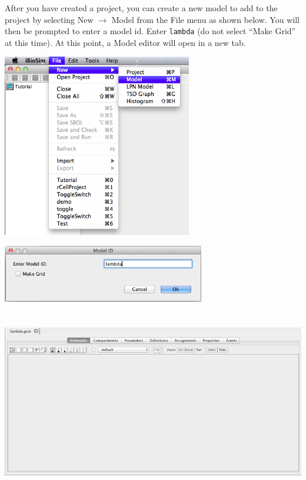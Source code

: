 \documentclass[titlepage,11pt]{article}
\begin{document}
\noindent
After you have created a project, you can create a new model to add to the project by selecting New $\rightarrow$ Model from the File menu as shown below. You will then be prompted to enter a model id.  Enter {\tt lambda} (do not select ``Make Grid'' at this time).  At this point, a Model editor will open in a new tab.

\begin{center}
\includegraphics[height=80mm]{screenshots/newModel}
\end{center}

\begin{center}
\includegraphics[height=25mm]{screenshots/ModelId}
\end{center}

\begin{center}
\includegraphics[height=80mm]{screenshots/ModelEditor}
\end{center}
\end{document}
